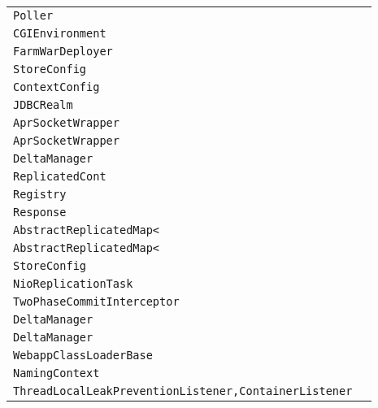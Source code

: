 \begin{center}
\begin{tabular}{ll}
\lstinline/Poller/&\raisebox{0pt}{\lstinline/ timeout(int,boolean)/}\\ 
\lstinline/CGIEnvironment/&\raisebox{0pt}{\lstinline/ expandCGIScript()/}\\ 
\lstinline/FarmWarDeployer/&\raisebox{0pt}{\lstinline/ booleancopy(Filefrom,Fileto)/}\\ 
\lstinline/StoreConfig/&\raisebox{0pt}{\lstinline/ booleanstore(Context)/}\\ 
\lstinline/ContextConfig/&\raisebox{0pt}{\lstinline/ processAnnotationsFile(File)/}\\ 
\lstinline/JDBCRealm/&\raisebox{0pt}{\lstinline/ startInternal()/}\\ 
\lstinline/AprSocketWrapper/&\raisebox{0pt}{\lstinline/ populateLocalPort()/}\\ 
\lstinline/AprSocketWrapper/&\raisebox{0pt}{\lstinline/ populateLocalPort()/}\\ 
\lstinline/DeltaManager/&\raisebox{0pt}{\lstinline/ messageReceived(SessionMessage,Member)/}\\ 
\lstinline/ReplicatedCont/&\raisebox{0pt}{\lstinline/ startInternal()/}\\ 
\lstinline/Registry/&\raisebox{0pt}{\lstinline/ loadDescriptors(Strng,ClassLoader)/}\\ 
\lstinline/Response/&\raisebox{0pt}{\lstinline/ sendRedirect(int)/}\\ 
\lstinline/AbstractReplicatedMap</&\raisebox{0pt}{\lstinline/ Vput()/}\\ 
\lstinline/AbstractReplicatedMap</&\raisebox{0pt}{\lstinline/ Vput()/}\\ 
\lstinline/StoreConfig/&\raisebox{0pt}{\lstinline/ booleanstore(Context)/}\\ 
\lstinline/NioReplicationTask/&\raisebox{0pt}{\lstinline/ sendAck()/}\\ 
\lstinline/TwoPhaseCommitInterceptor/&\raisebox{0pt}{\lstinline/ heartbeat()/}\\ 
\lstinline/DeltaManager/&\raisebox{0pt}{\lstinline/ messageReceived(SessionMessage)/}\\ 
\lstinline/DeltaManager/&\raisebox{0pt}{\lstinline/ messageReceived(SessionMessage)/}\\ 
\lstinline/WebappClassLoaderBase/&\raisebox{0pt}{\lstinline/ findClassInternal(String)/}\\ 
\lstinline/NamingContext/&\raisebox{0pt}{\lstinline/ Objectlookup(Name,boolean)/}\\ 
\lstinline/ThreadLocalLeakPreventionListener,ContainerListener/&\raisebox{0pt}{\lstinline/ containerEvent(ContainerEvent)/}\\ 

\end{tabular}
\end{center}
